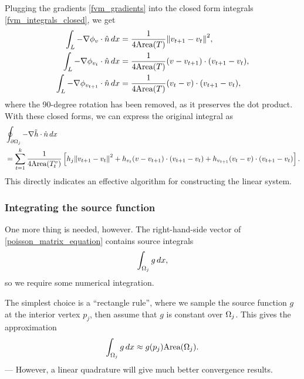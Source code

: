 Plugging the gradients \eqref{fvm_gradients} into the closed form integrals \eqref{fvm_integrals_closed}, we get
\begin{align*}
    \int_L -\nabla\phi_v\cdot\hat{n}\,dx
        &= \frac{1}{4\text{Area}(T)}\norm{v_{t+1} - v_t}^2,\\
    \int_L -\nabla\phi_{v_t}\cdot\hat{n}\,dx
        &= \frac{1}{4\text{Area}(T)}(v - v_{t+1})\cdot(v_{t+1} - v_t),\\
    \int_L -\nabla\phi_{v_{t+1}}\cdot\hat{n}\,dx
        &= \frac{1}{4\text{Area}(T)}(v_t - v)\cdot(v_{t+1} - v_t),
\end{align*}
where the 90-degree rotation has been removed, as it preserves the dot product.
With these closed forms, we can express the original integral as
\begin{equation}\label{flux_integral_summation}
\begin{split}
&\oint_{{\partial\Omega}_j} -\nabla \tilde{h}\cdot\hat{n}\,dx\\
    &=
    \sum_{t=1}^k
        \frac{1}{4\text{Area}(T^v_t)}
        \left[
        h_j \norm{v_{t+1} - v_{t}}^2
        +h_{v_t}(v - v_{t+1})\cdot(v_{t+1} - v_{t})
        +h_{v_{t+1}}(v_t - v)\cdot(v_{t+1} - v_{t})
        \right].
\end{split}
\end{equation}
This directly indicates an effective algorithm for constructing the linear system.

\subsubsection{Integrating the source function}
One more thing is needed, however. The right-hand-side vector of \eqref{poisson_matrix_equation} contains source integrals
    $$\int_{{\Omega}_j}g\,dx,$$
so we require some numerical integration.

The simplest choice is a ``rectangle rule'', where we sample the source function $g$ at the interior vertex
$p_j$, then assume that $g$ is constant over ${\Omega}_j$. This gives the approximation
\begin{equation}\label{fvm_source_approximation}
    \int_{{\Omega}_j}g\,dx \approx g(p_j)\text{Area}({\Omega}_j).
\end{equation}
--- However, a linear quadrature will give much better convergence results.

